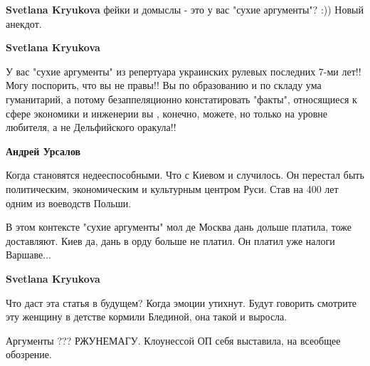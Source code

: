 \begin{itemize}
\begin{itemize}
\textbf{Svetlana Kryukova} фейки и домыслы - это у вас "сухие аргументы"? :)) Новый анекдот.

 
\textbf{Svetlana Kryukova} 

У вас "сухие аргументы" из репертуара украинских рулевых последних 7-ми лет!!
Могу поспорить, что вы не правы!! Вы по образованию и по складу ума
гуманитарий, а потому безаппеляционно констатировать "факты", относящиеся к
сфере экономики и инженерии вы , конечно, можете, но только на уровне любителя,
а не Дельфийского оракула!!


 
\textbf{Андрей Урсалов} 

Когда становятся недееспособными. Что с Киевом и случилось. Он перестал быть
политическим, экономическим и культурным центром Руси. Став на 400 лет одним из
воеводств Польши.

В этом контексте "сухие аргументы" мол де Москва дань дольше платила, тоже
доставляют. Киев да, дань в орду больше не платил. Он платил уже налоги
Варшаве...

 
\textbf{Svetlana Kryukova} 

Что даст эта статья в будущем? Когда эмоции утихнут. Будут говорить смотрите
эту женщину в детстве кормили Блединой, она такой и выросла.


 
Аргументы ??? РЖУНЕМАГУ. Клоунессой ОП себя выставила, на всеобщее обозрение.

 

\end{itemize}
\end{itemize}
